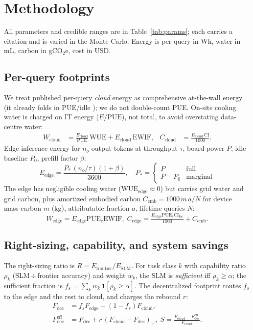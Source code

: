 \documentclass[conference]{IEEEtran}
\newcommand{\fs}{f_{s}}
\begin{document}
\section{Methodology}
\label{sec:methodology}
All parameters and credible ranges are in Table~\ref{tab:params}; each carries a
citation and is varied in the Monte-Carlo. Energy is per query in Wh, water in
mL, carbon in gCO$_2$e, cost in USD.

\subsection{Per-query footprints}
We treat published per-query \emph{cloud} energy as comprehensive at-the-wall
energy (it already folds in PUE/idle \cite{jegham2025,elsworth2025}); we do not
double-count PUE. On-site cooling water is charged on IT energy
($E/\mathrm{PUE}$), not total, to avoid overstating data-centre water:
\begin{align}
W_{\text{cloud}} &= \tfrac{E_{\text{cloud}}}{\mathrm{PUE}}\,\mathrm{WUE}
   + E_{\text{cloud}}\,\mathrm{EWIF}, &
C_{\text{cloud}} &= \tfrac{E_{\text{cloud}}\,\mathrm{CI}}{1000}.
\end{align}
Edge inference energy for $n_o$ output tokens at throughput $\tau$, board power
$P$, idle baseline $P_0$, prefill factor $\beta$:
\begin{equation}
E_{\text{edge}} = \frac{P_{\!*}\,(n_o/\tau)(1+\beta)}{3600},\quad
P_{\!*}=\begin{cases}P & \text{full}\\ P-P_0 & \text{marginal}\end{cases}
\label{eq:edge}
\end{equation}
The edge has negligible cooling water ($\mathrm{WUE}_{\text{edge}}\!\approx\!0$)
but carries grid water and grid carbon, plus amortized embodied carbon
$C_{\text{emb}}=1000\,m\,a/N$ for device mass-carbon $m$ (kg), attributable
fraction $a$, lifetime queries $N$:
\begin{equation}
W_{\text{edge}}=E_{\text{edge}}\mathrm{PUE}_e\mathrm{EWIF},\;
C_{\text{edge}}=\tfrac{E_{\text{edge}}\mathrm{PUE}_e\mathrm{CI}_{\text{loc}}}{1000}+C_{\text{emb}}.
\end{equation}

\subsection{Right-sizing, capability, and system savings}
The right-sizing ratio is $R=E_{\text{frontier}}/E_{\text{SLM}}$. For task class
$k$ with capability ratio $\rho_k$ (SLM\,$\div$\,frontier accuracy) and weight
$w_k$, the SLM is \emph{sufficient} iff $\rho_k\ge\alpha$; the sufficient fraction
is $\fs=\sum_k w_k\,\mathbf{1}[\rho_k\ge\alpha]$. The decentralized footprint
routes $\fs$ to the edge and the rest to cloud, and charges the rebound $r$:
\begin{align}
F_{\text{dec}}&=\fs F_{\text{edge}}+(1-\fs)F_{\text{cloud}},\\
F_{\text{dec}}^{\text{eff}}&=F_{\text{dec}}+r\,(F_{\text{cloud}}-F_{\text{dec}})_+,\;
S=\tfrac{F_{\text{cloud}}-F_{\text{dec}}^{\text{eff}}}{F_{\text{cloud}}}.
\label{eq:savings}
\end{align}
\end{document}

